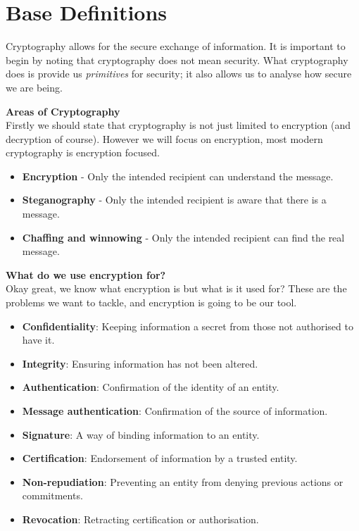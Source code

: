 \section{Base Definitions}
Cryptography allows for the secure exchange of information.
It is important to begin by noting that cryptography does not mean security.
What cryptography does is provide us \textit{primitives} for security; it also
allows us to analyse how secure we are being.

\vspace{5mm}
\textbf{Areas of Cryptography}\\
Firstly we should state that cryptography is not just limited to encryption
(and decryption of course).
However we will focus on encryption, most modern cryptography is encryption focused.
\begin{itemize}
    \item \textbf{Encryption} - Only the intended recipient can understand the message.
    \item \textbf{Steganography} - Only the intended recipient is aware that there is a message.
    \item \textbf{Chaffing and winnowing} - Only the intended recipient can find the real message.
\end{itemize}


\vspace{5mm}
\textbf{What do we use encryption for?}\\
Okay great, we know what encryption is but what is it used for?
These are the problems we want to tackle,
and encryption is going to be our tool.
\begin{itemize}
    \item \textbf{Confidentiality}: Keeping information a secret from those not authorised to have it.
    \item \textbf{Integrity}: Ensuring information has not been altered.
    \item \textbf{Authentication}: Confirmation of the identity of an entity.
    \item \textbf{Message authentication}: Confirmation of the source of information.
    \item \textbf{Signature}: A way of binding information to an entity.
    \item \textbf{Certification}: Endorsement of information by a trusted entity.
    \item \textbf{Non-repudiation}: Preventing an entity from denying previous actions or commitments.
    \item \textbf{Revocation}: Retracting certification or authorisation.
\end{itemize}


